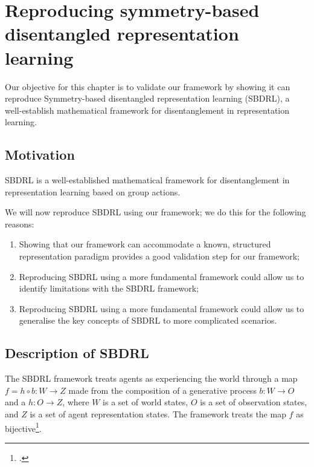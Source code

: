 \chapter{Reproducing symmetry-based disentangled representation learning}



Our objective for this chapter is to validate our framework by showing it can reproduce Symmetry-based disentangled representation learning (SBDRL), a well-establish mathematical framework for disentanglement in representation learning.

\section{Motivation}

SBDRL is a well-established mathematical framework for disentanglement in representation learning based on group actions.


We will now reproduce SBDRL using our framework; we do this for the following reasons:
\begin{enumerate}[(1)]
	\item Showing that our framework can accommodate a known, structured representation paradigm provides a good validation step for our framework;
	\item Reproducing SBDRL using a more fundamental framework could allow us to identify limitations with the SBDRL framework;
	\item Reproducing SBDRL using a more fundamental framework could allow us to generalise the key concepts of SBDRL to more complicated scenarios.
\end{enumerate}

\section{Description of SBDRL}

The SBDRL framework treats agents as experiencing the world through a map $f = h \circ b: W \to Z$ made from the composition of a generative process $b: W \to O$ and a $h: O \to Z$, where $W$ is a set of world states, $O$ is a set of observation states, and $Z$ is a set of agent representation states.
The framework treats the map $f$ as bijective\footnote{.}.

